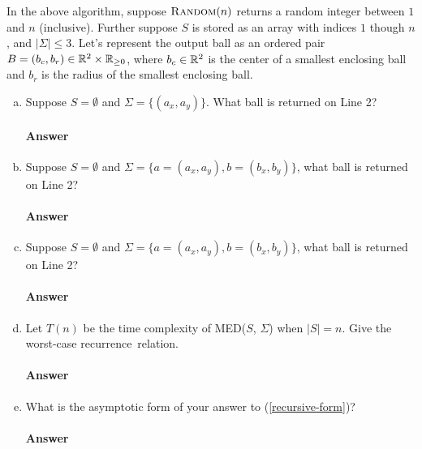 \documentclass{article}
\begin{document}
In the above algorithm, suppose $\textsc{Random}(n)$ returns a random integer
between $1$ and $n$ (inclusive).  Further suppose
$S$ is stored as an array with indices $1$ though $n$,
and $|\Sigma| \leq 3$.  Let's represent the output ball as an ordered
pair~$B=(b_c,b_r) \in {\mathbb R}^2 \times {\mathbb R}_{\geq 0}$,
where $b_c\in {\mathbb R}^2$ is the center of a smallest enclosing ball and $b_r$ is the
radius of the smallest enclosing ball.

\begin{enumerate}[(a)]
    \item
        Suppose $S=\emptyset$ and $\Sigma=\{ (a_x,a_y)\}$. What ball is returned on Line 2?
        \paragraph{Answer}
    \item
        Suppose $S=\emptyset$ and $\Sigma=\{ a=(a_x,a_y),b=(b_x,b_y)\}$, what ball is returned on Line 2?
        \paragraph{Answer}
    \item
        Suppose $S=\emptyset$ and $\Sigma=\{ a=(a_x,a_y),b=(b_x,b_y)\}$, what ball is returned on Line 2?
        \paragraph{Answer}

    \item Let $T(n)$ be the time complexity of MED($S$, $\Sigma$) when
        $|S|=n$.  Give the worst-case recurrence~relation.\label{recursive-form}
        \paragraph{Answer}
    \item What is the asymptotic form of your answer to (\ref{recursive-form})?
        \paragraph{Answer}
\end{enumerate}


\collab{\todo{}}
\end{document}
